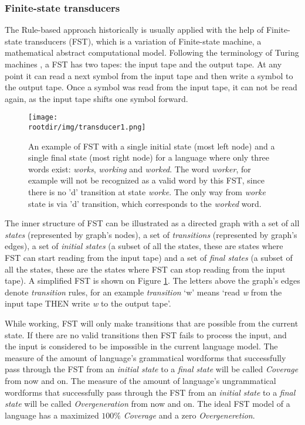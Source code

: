 \subsubsection{Finite-state transducers}
The Rule-based approach historically is usually applied with the help of Finite-state transducers (FST), which is a variation of Finite-state machine, a mathematical abstract computational model. Following the terminology of Turing machines \parencite{Turing_1937}, a FST has two tapes: the input tape and the output tape. At any point it can read a next symbol from the input tape and then write a symbol to the output tape. Once a symbol was read from the input tape, it can not be read again, as the input tape shifts one symbol forward. 

\begin{figure}[!h]
    \centering
    \texttt{[image: \\rootdir/img/transducer1.png]}
    \caption{An example of FST with a single initial state (most left node) and a single final state (most right node) for a language where only three words exist: \textit{works}, \textit{working} and \textit{worked}. The word \textit{worker}, for example will not be recognized as a valid word by this FST, since there is no 'd' transition at state \textit{worke}. The only way from \textit{worke} state is via 'd' transition, which corresponds to the \textit{worked} word. \parencite{beesley_fst_2002}}
    \label{fig:fst1}
\end{figure}

The inner structure of FST can be illustrated as a directed graph with a set of all \textit{states} (represented by graph's nodes), a set of \textit{transitions} (represented by graph's edges), a set of \textit{initial states} (a subset of all the states, these are states where FST can start reading from the input tape) and a set of \textit{final states} (a subset of all the states, these are the states where FST can stop reading from the input tape). A simplified FST is shown on Figure \ref{fig:fst1}. The letters above the graph's edges denote \textit{transition} rules, for an example \textit{transition} `w' means `read \textit{w} from the input tape THEN write \textit{w} to the output tape'.

While working, FST will only make transitions that are possible from the current state. If there are no valid transitions then FST fails to process the input, and the input is considered to be impossible in the current language model. The measure of the amount of language's grammatical wordforms that successfully pass through the FST from an \textit{initial state} to a \textit{final state} will be called \textit{Coverage} from now and on. The measure of the amount of language's ungrammatical wordforms that successfully pass through the FST from an \textit{initial state} to a \textit{final state} will be called \textit{Overgeneration} from now and on. The ideal FST model of a language has a maximized $100\%$ \textit{Coverage} and a zero \textit{Overgeneretion}.

